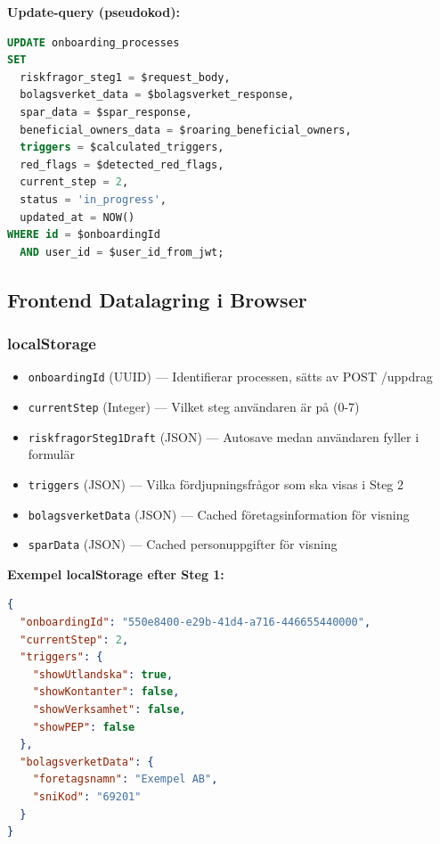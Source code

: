 \textbf{Update-query (pseudokod):}
\begin{lstlisting}[language=sql]
UPDATE onboarding_processes
SET 
  riskfragor_steg1 = $request_body,
  bolagsverket_data = $bolagsverket_response,
  spar_data = $spar_response,
  beneficial_owners_data = $roaring_beneficial_owners,
  triggers = $calculated_triggers,
  red_flags = $detected_red_flags,
  current_step = 2,
  status = 'in_progress',
  updated_at = NOW()
WHERE id = $onboardingId
  AND user_id = $user_id_from_jwt;
\end{lstlisting}

\subsection{Frontend Datalagring i Browser}

\subsubsection{localStorage}

\begin{itemize}[noitemsep]
  \item \texttt{onboardingId} (UUID) — Identifierar processen, sätts av POST /uppdrag
  \item \texttt{currentStep} (Integer) — Vilket steg användaren är på (0-7)
  \item \texttt{riskfragorSteg1Draft} (JSON) — Autosave medan användaren fyller i formulär
  \item \texttt{triggers} (JSON) — Vilka fördjupningsfrågor som ska visas i Steg 2
  \item \texttt{bolagsverketData} (JSON) — Cached företagsinformation för visning
  \item \texttt{sparData} (JSON) — Cached personuppgifter för visning
\end{itemize}

\textbf{Exempel localStorage efter Steg 1:}
\begin{lstlisting}[language=json]
{
  "onboardingId": "550e8400-e29b-41d4-a716-446655440000",
  "currentStep": 2,
  "triggers": {
    "showUtlandska": true,
    "showKontanter": false,
    "showVerksamhet": false,
    "showPEP": false
  },
  "bolagsverketData": {
    "foretagsnamn": "Exempel AB",
    "sniKod": "69201"
  }
}
\end{lstlisting}

